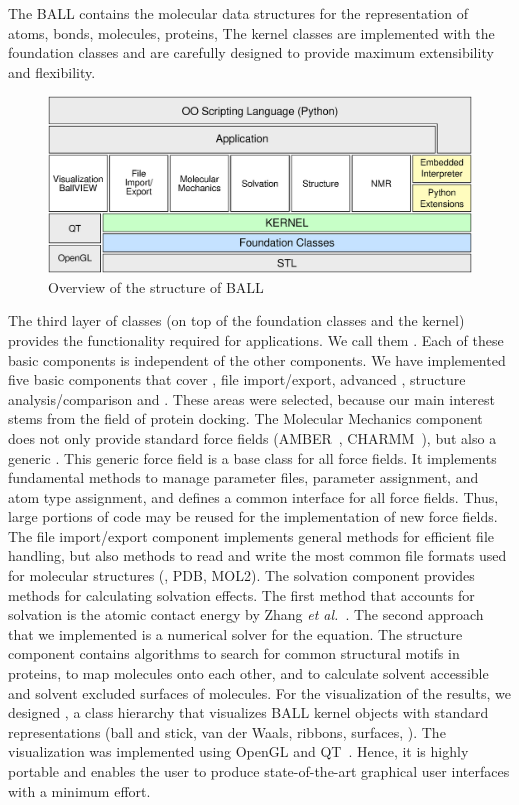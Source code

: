 The BALL  contains the molecular data structures for the
representation of atoms, bonds, molecules, proteins, \etc  The kernel classes
are implemented with the foundation classes and are carefully designed to
provide maximum extensibility and flexibility.
\begin{figure}[tb]
  \centering\includegraphics[width=\textwidth]{BALL_structure.eps}
  \caption{Overview of the structure of BALL}
  \label{fig:BALL_structure}
\end{figure}

The third layer of classes (on top of the foundation classes and the kernel)
provides the functionality required for applications. We call them
. Each of these basic components is independent of
the other components.  We have implemented five basic components that cover
, file import/export, advanced , structure analysis/comparison and . These
areas were selected, because our main interest stems from the field of protein
docking. The Molecular Mechanics component does not only provide standard
force fields (AMBER~\cite{AMBER95}, CHARMM~\cite{BBO+83}), but also a generic
.  This generic force field is a base class for all force
fields. It implements fundamental methods to manage parameter files, parameter
assignment, and atom type assignment, and defines a common interface for all
force fields. Thus, large portions of code may be reused for the
implementation of new force fields.  The file import/export component
implements general methods for efficient file handling, but also methods to
read and write the most common file formats used for molecular structures
(\eg, PDB, MOL2). The solvation component provides methods for calculating
solvation effects. The first method that accounts for solvation is the atomic
contact energy by Zhang {\it et al.}~\cite{ZVC+97}. The second approach that
we implemented is a numerical solver for the  equation.  The
structure component contains algorithms to search for common structural motifs
in proteins, to map molecules onto each other, and to calculate solvent
accessible and solvent excluded surfaces of molecules. For the visualization
of the results, we designed , a class hierarchy that
visualizes BALL kernel objects with standard representations (ball and stick,
van der Waals, ribbons, surfaces, \etc). The visualization was implemented
using OpenGL and QT~\cite{QT}. Hence, it is highly portable and enables the
user to produce state-of-the-art graphical user interfaces with a minimum
effort.

